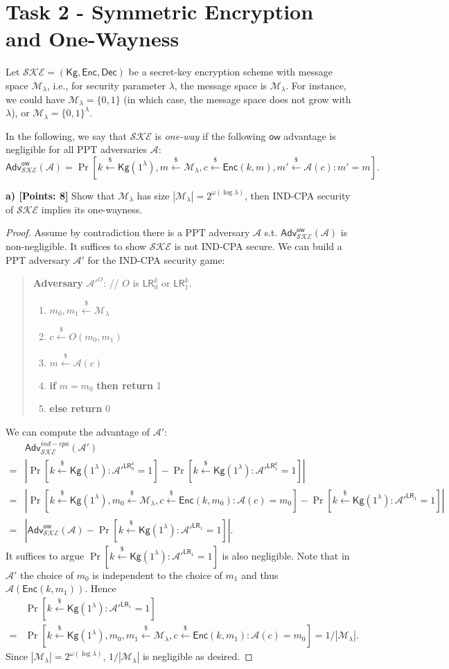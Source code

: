 \documentclass[12pt]{article}
\newcommand{\bits}{\{0,1\}}
\newcommand{\getsr}{\stackrel{\$}{\gets}}
\newcommand{\Adv}{\textsf{Adv}}
\newcommand{\M}{\mathcal{M}}
\theoremstyle{definition}
\newcommand{\Kg}{\textsf{Kg}}
\newcommand{\Enc}{\textsf{Enc}}
\newcommand{\Dec}{\textsf{Dec}}
\newcommand{\A}{\mathcal{A}}
\newcommand{\LR}{\textsf{LR}}
\begin{document}
\section{Task 2 - Symmetric Encryption and One-Wayness}
\newcommand{\SKE}{\mathcal{SKE}}
\newcommand{\ow}{\mathsf{ow}}
Let $\SKE = (\Kg, \Enc, \Dec)$ be a secret-key encryption scheme with message space $\M_{\lambda}$, i.e., for security parameter $\lambda$, the message space is $\M_{\lambda}$. For instance, we could have $\M_{\lambda} = \bits$ (in which case, the message space does not grow with $\lambda$), or $\M_{\lambda} = \bits^\lambda$.

In the following, we say that $\SKE$ is \emph{one-way} if the following $\ow$ advantage is negligible for all PPT adversaries $\A$:
$$\Adv_{\SKE}^{\ow}(\A) = \Pr[k \getsr \Kg(1^\lambda), m \getsr \M_{\lambda}, c\getsr \Enc(k,m), m' \getsr \A(c): m'=m].$$

{\bf a) [Points: 8]} Show that $\M_{\lambda}$ has size $|\M_{\lambda}| = 2^{\omega(\log \lambda)}$, then IND-CPA security of $\SKE$ implies its one-wayness.
\begin{proof}
Assume by contradiction there is a PPT adversary $\A$ s.t. $\Adv_{\SKE}^{\ow}(\A)$ is non-negligible. It suffices to show $\SKE$ is not IND-CPA secure. We can build a PPT adversary $\A'$ for the IND-CPA security game:
\begin{quote}
{\bf Adversary} $\A'^O$: // $O$ is $\LR_0^k$ or $\LR_1^k$.
\begin{enumerate}
\item $m_0, m_1 \getsr \M_{\lambda}$
\item $c \getsr O(m_0,m_1)$
\item $m \getsr \A(c)$
\item {\bf if} $m=m_0$ {\bf then return} 1
\item {\bf else return} 0
\end{enumerate}
\end{quote}
We can compute the advantage of $\A'$:
$$\begin{aligned}
&\Adv_{\SKE}^{ind-cpa}(\A') \\
=& |\Pr[k \getsr \Kg(1^\lambda): \A'^{\LR_0^k}=1] - \Pr[k \getsr \Kg(1^\lambda): \A'^{\LR_1^k}=1]| \\
=& |\Pr[k \getsr \Kg(1^\lambda), m_0 \getsr \M_{\lambda}, c \getsr \Enc(k, m_0): \A(c)=m_0] - \Pr[k \getsr \Kg(1^\lambda): \A'^{\LR_1}=1]| \\
=& |\Adv_{\SKE}^{\ow}(\A) - \Pr[k \getsr \Kg(1^\lambda): \A'^{\LR_1}=1]|.
\end{aligned}$$
It suffices to argue $\Pr[k \getsr \Kg(1^\lambda): \A'^{\LR_1}=1]$ is also negligible. Note that in $\A'$ the choice of $m_0$ is independent to the choice of $m_1$ and thus $\A(\Enc(k,m_1))$. Hence
$$\begin{aligned}
&\Pr[k \getsr \Kg(1^\lambda): \A'^{\LR_1}=1] \\
=& \Pr[k \getsr \Kg(1^\lambda), m_0,m_1 \getsr \M_{\lambda}, c \getsr \Enc(k, m_1): \A(c)=m_0] 
= 1/|\M_{\lambda}|.
\end{aligned}$$
Since $|\M_{\lambda}| = 2^{\omega(\log \lambda)}$, $1/|\M_{\lambda}|$ is negligible as desired.
\end{proof}
\end{document}
